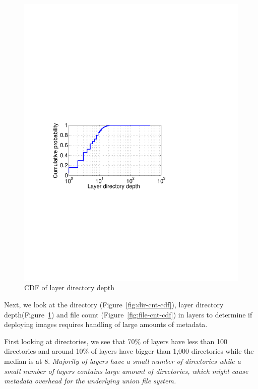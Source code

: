 \begin{figure}[t]
\begin{minipage}{0.22\textwidth}
		\includegraphics[width=1\textwidth]{graphs/layer-depth-cdf.pdf}
		\caption{CDF of layer directory depth}
		\label{fig:layer-depth-cdf}
	\end{minipage}
\end{figure}

Next, we look at the directory (Figure~\ref{fig:dir-cnt-cdf}), layer directory depth(Figure~\ref{fig:layer-depth-cdf}) and file count
(Figure~\ref{fig:file-cnt-cdf}) in layers to determine if deploying images requires
handling of large amounts of metadata. 

First looking at directories, we see that 
70\% of layers have less than 100 directories and around 10\% of layers have bigger than 1,000 directories while the median is at 8. 
\textit{Majority of layers have a small number of directories while a small number of layers contains large amount of directories, which might cause metadata overhead for the underlying union file system.}

